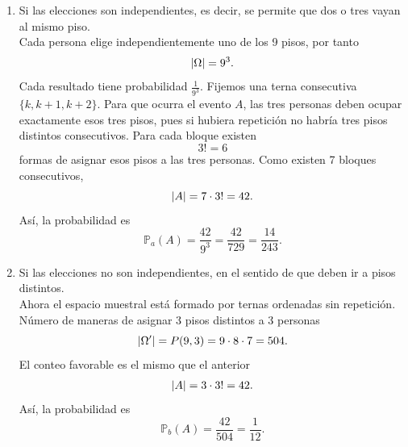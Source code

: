 \documentclass[12pt,a4paper]{article}
\begin{document}
    \begin{solucion}
        \begin{enumerate}
            \item[(a)] Si las elecciones son independientes, es decir, se permite que dos o tres vayan al mismo piso.\\
            Cada persona elige independientemente uno de los 9 pisos, por tanto
            \begin{equation*}
                \abs{\Omega}=9^{3}.
            \end{equation*}
            Cada resultado tiene probabilidad $\frac{1}{9^{3}}$. Fijemos una terna consecutiva $\{k,k+1,k+2\}$.
            Para que ocurra el evento $A$, las tres personas deben ocupar exactamente esos tres pisos, pues si
            hubiera repetición no habría tres pisos distintos consecutivos. Para cada bloque existen
            \begin{equation*}
                3!=6
            \end{equation*}
            formas de asignar esos pisos a las tres personas. Como existen 7 bloques consecutivos,
            \begin{equation*}
                \abs{A}=7\cdot3!=42.
            \end{equation*}
            Así, la probabilidad es
            \begin{equation*}
                \mathbb{P}_{a}(A)=\frac{42}{9^{3}}=\frac{42}{729}=\frac{14}{243}.
            \end{equation*}
            \item[(b)] Si las elecciones no son independientes, en el sentido de que deben ir a pisos distintos.\\
            Ahora el espacio muestral está formado por ternas ordenadas sin repetición. Número de maneras
            de asignar 3 pisos distintos a 3 personas
            \begin{equation*}
                \abs{\Omega^{\prime}}=P(9,3)=9\cdot8\cdot7=504.
            \end{equation*}
            El conteo favorable es el mismo que el anterior
            \begin{align*}
                \abs{A}=3\cdot3!=42.
            \end{align*}
            Así, la probabilidad es
            \begin{equation*}
                \mathbb{P}_{b}(A)=\frac{42}{504}=\frac{1}{12}.
            \end{equation*}
        \end{enumerate}
    \end{solucion}
\end{document}
